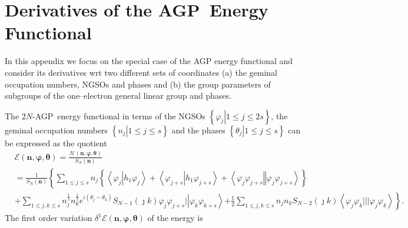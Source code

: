 \documentclass[aps,preprint]{revtex4}%
\begin{document}
\section{Derivatives of the AGP\ Energy Functional\label{variational}}

In this appendix we focus on the special case of the AGP energy functional and
consider its derivatives wrt two different sets of coordinates (a) the geminal
occupation numbers, NGSOs and phases and (b) the group parameters of subgroups
of the one--electron general linear group and phases.

The $2N$-AGP\ energy functional in terms of the NGSOs $\left\{  \left.
\varphi_{j}\right\vert 1\leq j\leq2s\right\}  $, the geminal occupation
numbers $\left\{  \left.  n_{j}\right\vert 1\leq j\leq s\right\}  $ and the
phases $\left\{  \left.  \theta_{j}\right\vert 1\leq j\leq s\right\}  $ can be
expressed as the quotient%
\begin{align}
&  \mathcal{E}\left(  \boldsymbol{n},\boldsymbol{\varphi},\boldsymbol{\theta
}\right)  =\frac{\mathcal{H}\left(  \boldsymbol{n},\boldsymbol{\varphi
},\boldsymbol{\theta}\right)  }{S_{N}\left(  \boldsymbol{n}\right)
}\nonumber\\
&  =\frac{1}{S_{N}\left(  \boldsymbol{n}\right)  }\left\{  \sum_{1\leq j\leq
s}n_{j}\left\{  \left\langle \varphi_{j}\left\vert h_{1}\varphi_{j}\right.
\right\rangle +\left\langle \varphi_{j+s}\left\vert h_{1}\varphi_{j+s}\right.
\right\rangle +\left\langle \varphi_{j}\varphi_{j+s}\left\Vert \varphi
_{j}\varphi_{j+s}\right.  \right\rangle \right\}  \right. \nonumber\\
&  +\sum_{1\leq j,k\leq s}n_{j}^{\frac{1}{2}}n_{k}^{\frac{1}{2}}e^{i\left(
\theta_{j}-\theta_{k}\right)  }S_{N-1}\left(  \jmath k\right)  \varphi
_{j}\varphi_{j+s}|\left\vert \varphi_{k}\varphi_{k+s}\right\rangle \left.
+\frac{1}{2}\sum_{1\leq j,k\leq s}n_{j}n_{k}S_{N-2}\left(  \jmath k\right)
\left\langle \varphi_{j}\varphi_{k}|||\varphi_{j}\varphi_{k}\right\rangle
\right\}  .
\end{align}
The first order variation $\delta^{1}\mathcal{E}\left(  \boldsymbol{n}%
,\boldsymbol{\varphi},\boldsymbol{\theta}\right)  $ of the energy is
\end{document}
